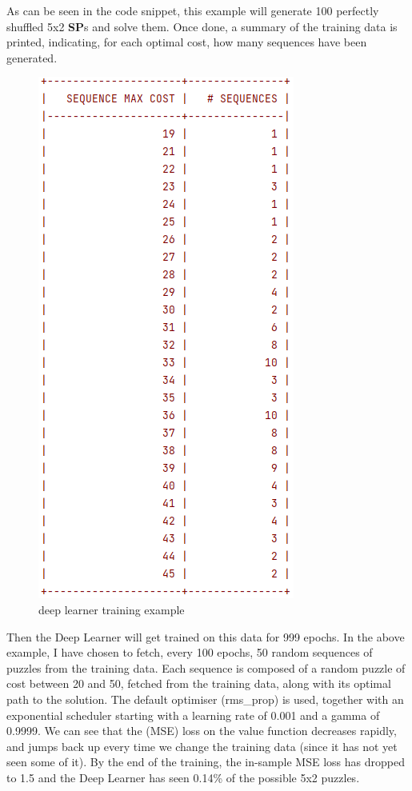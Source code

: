 \noindent As can be seen in the code snippet, this example will generate 100 perfectly shuffled 5x2 \textbf{SP}s and solve them. Once done, a summary of the training data is printed, indicating, for each optimal cost, how many sequences have been generated.

\begin{figure}[H]
\centering
\includegraphics[scale=0.45]{./Figures/exampledeeplearnertraining}
\caption[Examples]{deep learner training example}
\label{fig:exampledeeplearnertraining}
\end{figure}

\noindent Then the Deep Learner will get trained on this data for 999 epochs. In the above example, I have chosen to fetch, every 100 epochs, 50 random sequences of puzzles from the training data. Each sequence is composed of a random puzzle of cost between 20 and 50, fetched from the training data, along with its optimal path to the solution. The default optimiser (rms\_prop) is used, together with an exponential scheduler starting with a learning rate of 0.001 and a gamma of 0.9999. We can see that the (MSE) loss on the value function decreases rapidly, and jumps back up every time we change the training data (since it has not yet seen some of it). By the end of the training, the in-sample MSE loss has dropped to 1.5 and the Deep Learner has seen 0.14\% of the possible 5x2 puzzles.




